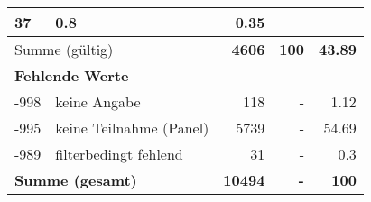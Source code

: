 \begin{longtable}{lXrrr}
       \num{37} &
       \num[round-mode=places,round-precision=2]{0.8} &
         \num[round-mode=places,round-precision=2]{0.35} \\
     \midrule
     \multicolumn{2}{l}{Summe (gültig)} &
       \textbf{\num{4606}} &
     \textbf{\num{100}} &
       \textbf{\num[round-mode=places,round-precision=2]{43.89}} \\
     \multicolumn{5}{l}{\textbf{Fehlende Werte}}\\
       -998 &
       keine Angabe &
         \num{118} &
        - &
         \num[round-mode=places,round-precision=2]{1.12} \\
       -995 &
       keine Teilnahme (Panel) &
         \num{5739} &
        - &
         \num[round-mode=places,round-precision=2]{54.69} \\
       -989 &
       filterbedingt fehlend &
         \num{31} &
        - &
         \num[round-mode=places,round-precision=2]{0.3} \\
     \midrule
     \multicolumn{2}{l}{\textbf{Summe (gesamt)}} &
          \textbf{\num{10494}} &
        \textbf{-} &
        \textbf{\num{100}} \\
     \bottomrule
     \end{longtable}
     
